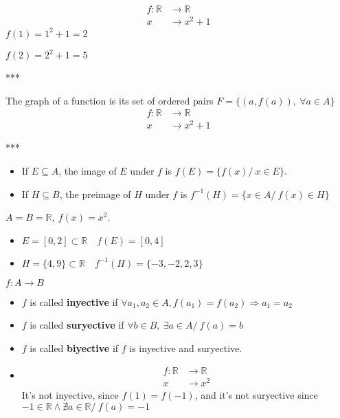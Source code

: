 \documentclass[12pt, a4paper]{book}
\begin{document}
\begin{exmp}
  \begin{align*}
    f:\mathbb{R} &\longrightarrow \mathbb{R} \\
    x &\longrightarrow x^2+1
  \end{align*}
  $f(1) = 1^2+1 = 2$

  $f(2) = 2^2+1 = 5$

  ***
\end{exmp}

\begin{defn}
  The graph of a function is its set of ordered pairs $F=\{(a,f(a)),\ \forall a\in A\}$
  \begin{align*}
    f:\mathbb{R} &\longrightarrow \mathbb{R} \\
    x &\longrightarrow x^2+1
  \end{align*}

  ***
\end{defn}

\begin{defn}
  \begin{itemize}
    \item If $E \subseteq A$, the image of $E$ under $f$ is $f(E) = \{f(x)/\ x\in E\}$.
    \item If $H \subseteq B$, the preimage of $H$ under $f$ is $f^{-1}(H) = \{x\in A/\ f(x)\in H\}$
  \end{itemize}
\end{defn}

\begin{exmp}
  $A=B=\mathbb{R},\ f(x) = x^2$.
  \begin{itemize}
    \item $E = [0,2] \subset \mathbb{R} \quad f(E) = [0,4]$
    \item $H = \{4,9\} \subset \mathbb{R} \quad f^{-1}(H) = \{-3,-2,2,3\}$
  \end{itemize}
\end{exmp}

\begin{defn}
  $f:A\longrightarrow B$
  \begin{itemize}
    \item $f$ is called \textbf{inyective} if $\forall a_1,a_2 \in A, f(a_1)=f(a_2) \Rightarrow a_1=a_2$
    \item $f$ is called \textbf{suryective} if $\forall b \in B,\ \exists a\in A /\ f(a)=b$
    \item $f$ is called \textbf{biyective} if $f$ is inyective and suryective.
  \end{itemize}
\end{defn}

\begin{exmp}
  \begin{itemize}
    \item 
    \begin{align*}
      f:\mathbb{R} &\longrightarrow \mathbb{R} \\
      x &\longrightarrow x^2
    \end{align*}
    It's not inyective, since $f(1) = f(-1)$, and it's not suryective since $-1\in\mathbb{R} \wedge \nexists a \in \mathbb{R}/\ f(a)=-1$
  \end{itemize}
\end{exmp}
\end{document}
